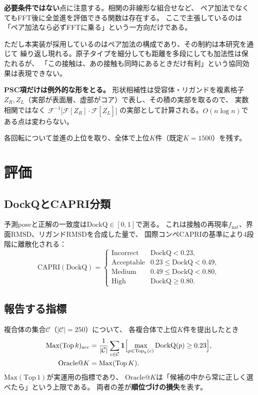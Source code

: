 \documentclass[11pt,a4paper]{article}
\newcommand{\dockq}{\mathrm{DockQ}}
\begin{document}
\textbf{必要条件ではない}点に注意する。相関の非線形な組合せなど、
ペア加法でなくてもFFT後に全並進を評価できる関数は存在する。
ここで主張しているのは「ペア加法なら必ずFFTに乗る」という一方向だけである。

ただし本実装が採用しているのはペア加法の構成であり、その制約は本研究を通じて
繰り返し現れる。原子タイプを細分しても距離を多段にしても加法性は保たれるが、
「この接触は、あの接触も同時にあるときだけ有利」という協同効果は表現できない。

\textbf{PSC項だけは例外的な形をとる。} 形状相補性は受容体・リガンドを複素格子
$Z_R, Z_L$（実部が表面層、虚部がコア）で表し、その積の実部を取るので、
実数相関ではなく
$\mathcal{F}^{-1}\bigl[\mathcal{F}[Z_R]\cdot\overline{\mathcal{F}[\overline{Z_L}]}\bigr]$
の実部として計算される。$O(n\log n)$である点は変わらない。

各回転について並進の上位を取り、全体で上位$K$件（既定$K = 1500$）を残す。

\section{評価}

\subsection{DockQとCAPRI分類}

予測poseと正解の一致度は$\dockq \in [0,1]$で測る。
これは接触の再現率$f_{\mathrm{nat}}$、界面RMSD、リガンドRMSDを合成した量で、
国際コンペCAPRIの基準により4段階に離散化される：
\begin{equation}
  \mathrm{CAPRI}(\dockq) =
  \begin{cases}
    \text{Incorrect}  & \dockq < 0.23,\\
    \text{Acceptable} & 0.23 \le \dockq < 0.49,\\
    \text{Medium}     & 0.49 \le \dockq < 0.80,\\
    \text{High}       & \dockq \ge 0.80 .
  \end{cases}
\end{equation}

\subsection{報告する指標}

複合体の集合$\mathcal{C}$（$|\mathcal{C}| = 250$）について、
各複合体で上位$K$件を提出したとき
\begin{align}
  \mathrm{Max}(\mathrm{Top}\,k)_{\text{acc}}
  &= \frac{1}{|\mathcal{C}|}\sum_{c \in \mathcal{C}}
     \mathbf{1}\Bigl[\max_{p \in \mathrm{Top}_k(c)} \dockq(p) \ge 0.23\Bigr],\\
  \mathrm{Oracle}@K &= \mathrm{Max}(\mathrm{Top}\,K) .
\end{align}
$\mathrm{Max}(\mathrm{Top}\,1)$が実運用の指標であり、
$\mathrm{Oracle}@K$は「候補の中から常に正しく選べたら」という上限である。
両者の差が\textbf{順位づけの損失}を表す。
\end{document}
